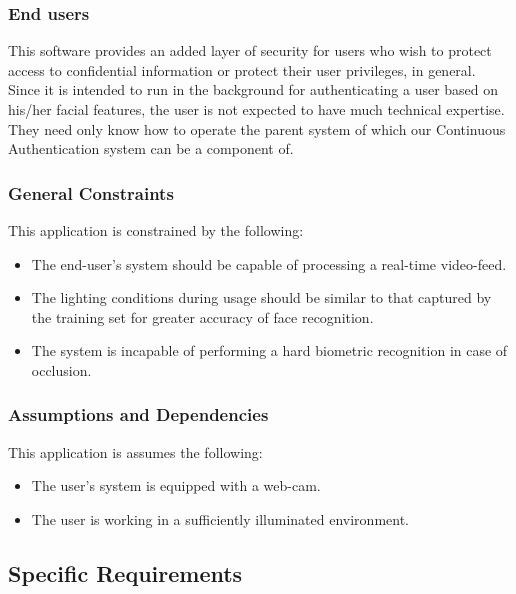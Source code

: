 \documentclass[12pt]{article}			%
\begin{document}
\subsubsection{ End users }
This software provides an added layer of security for users who wish to protect access to confidential information or protect their user privileges, in general. Since it is intended to run in the background for authenticating a user based on his/her facial features, the user is not expected to have much technical expertise. They need only know how to operate the parent system of which our Continuous Authentication system can be a component of.

\subsubsection{ General Constraints }
This application is constrained by the following:
\begin{itemize}
	\item The end-user's system should be capable of processing a real-time video-feed.
	\item The lighting conditions during usage should be similar to that captured by the training set for greater accuracy of face recognition.
	\item The system is incapable of performing a hard biometric recognition in case of occlusion.
\end{itemize}

\subsubsection{ Assumptions and Dependencies }
This application is assumes the following:
\begin{itemize}
	\item The user's system is equipped with a web-cam.
	\item The user is working in a sufficiently illuminated environment.
\end{itemize}

\subsection{ Specific Requirements }
\end{document}
